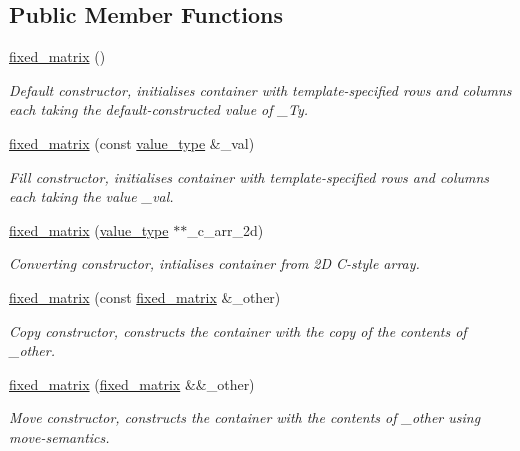 \subsection*{Public Member Functions}
\begin{DoxyCompactItemize}
\item 
\hyperlink{classcrsc_1_1fixed__matrix_aaf8985f4a1eb53e1fb105b0d5893f009}{fixed\+\_\+matrix} ()
\begin{DoxyCompactList}\small\item\em Default constructor, initialises container with template-\/specified rows and columns each taking the default-\/constructed value of {\ttfamily \+\_\+\+Ty}. \end{DoxyCompactList}\item 
\hyperlink{classcrsc_1_1fixed__matrix_a16fae497d1d5e7add36f049df6346e29}{fixed\+\_\+matrix} (const \hyperlink{classcrsc_1_1fixed__matrix_a1d0717197dc43f3752d508763a8b5a9e}{value\+\_\+type} \&\+\_\+val)
\begin{DoxyCompactList}\small\item\em Fill constructor, initialises container with template-\/specified rows and columns each taking the value {\ttfamily \+\_\+val}. \end{DoxyCompactList}\item 
\hyperlink{classcrsc_1_1fixed__matrix_ae9e6b3c3cb47a82120a5c2210bc4c2d1}{fixed\+\_\+matrix} (\hyperlink{classcrsc_1_1fixed__matrix_a1d0717197dc43f3752d508763a8b5a9e}{value\+\_\+type} $\ast$$\ast$\+\_\+c\+\_\+arr\+\_\+2d)
\begin{DoxyCompactList}\small\item\em Converting constructor, intialises container from 2D C-\/style array. \end{DoxyCompactList}\item 
\hyperlink{classcrsc_1_1fixed__matrix_adb509f10104cd8082d4b4147fd4d13e4}{fixed\+\_\+matrix} (const \hyperlink{classcrsc_1_1fixed__matrix}{fixed\+\_\+matrix} \&\+\_\+other)
\begin{DoxyCompactList}\small\item\em Copy constructor, constructs the container with the copy of the contents of {\ttfamily \+\_\+other}. \end{DoxyCompactList}\item 
\hyperlink{classcrsc_1_1fixed__matrix_ad335d4983247b940eac0bb82718dd1b5}{fixed\+\_\+matrix} (\hyperlink{classcrsc_1_1fixed__matrix}{fixed\+\_\+matrix} \&\&\+\_\+other)
\begin{DoxyCompactList}\small\item\em Move constructor, constructs the container with the contents of {\ttfamily \+\_\+other} using move-\/semantics. \end{DoxyCompactList}\item 
$$
\end{DoxyCompactItemize}
